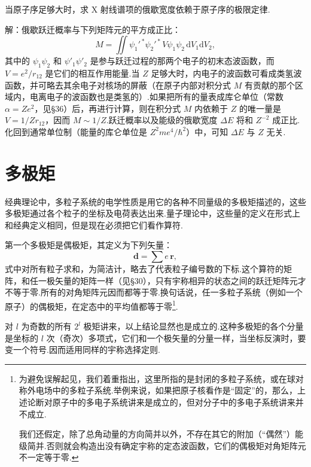 \begin{xiti}

\quad 当原子序足够大时，求 X 射线谱项的俄歇宽度依赖于原子序的极限定律.

解：俄歇跃迁概率与下列矩阵元的平方成正比：
\begin{equation*}
  M=\iint\psi_1'^{\,*}\psi_2'^{\,*}\,V\psi_1\psi_2\,\mathrm{d}V_1\mathrm{d}V_2,
\end{equation*}
其中的 $\psi_1\psi_2$ 和 $\psi'_1\psi'_2$ 是参与跃迁过程的那两个电子的初末态波函数，而 $V=e^{2}/r_{12}$ 是它们的相互作用能量.当 $Z$ 足够大时，内电子的波函数可看成类氢波函数，并可略去其余电子对核场的屏蔽（在原子内部对积分式 $M$ 有贡献的那个区域内，电离电子的波函数也是类氢的）.如果把所有的量表成库仑单位（常数 $\alpha=Ze^{2}$，见§36）后，再进行计算，则在积分式 $M$ 内依赖于 $Z$ 的唯一量是 $V=1/Zr_{12}$，因而 $M\sim1/Z$.跃迁概率以及能级的俄歇宽度 $\Delta E$ 将和 $Z^{-2}$ 成正比.化回到通常单位制（能量的库仑单位是 $Z^{2}me^{4}/\hbar^{2}$）中，可知 $\Delta E$ 与 $Z$ 无关.

\end{xiti}

\section{多极矩}

经典理论中，多粒子系统的电学性质是用它的各种不同量级的多极矩描述的，这些多极矩通过各个粒子的坐标及电荷表达出来.量子理论中，这些量的定义在形式上和经典定义相同，但是现在必须把它们看作算符.

第一个多极矩是偶极矩，其定义为下列矢量：
\begin{equation*}
  \boldsymbol{d}=\sum e\,\boldsymbol{r},
\end{equation*}
式中对所有粒子求和，为简洁计，略去了代表粒子编号数的下标.这个算符的矩阵，和任一极矢量的矩阵一样（见§30），只有宇称相异的状态之间的跃迁矩阵元才不等于零.所有的对角矩阵元因而都等于零.换句话说，任一多粒子系统（例如一个原子）的偶极矩，在定态中的平均值都等于零\footnote{为避免误解起见，我们着重指出，这里所指的是封闭的多粒子系统，或在球对称外电场中的多粒子系统.举例来说，如果把原子核看作是“固定”的，那么，上述论断对原子中的多电子系统讲来是成立的，但对分子中的多电子系统讲来并不成立.

我们还假定，除了总角动量的方向简并以外，不存在其它的附加（“偶然”）能级简并.否则就会构造出没有确定宇称的定态波函数，它们的偶极矩对角矩阵元不一定等于零.}.

对 $l$ 为奇数的所有 $2^{l}$ 极矩讲来，以上结论显然也是成立的.这种多极矩的各个分量是坐标的 $l$ 次（奇次）多项式，它们和一个极矢量的分量一样，当坐标反演时，要变一个符号.因而适用同样的宇称选择定则.

